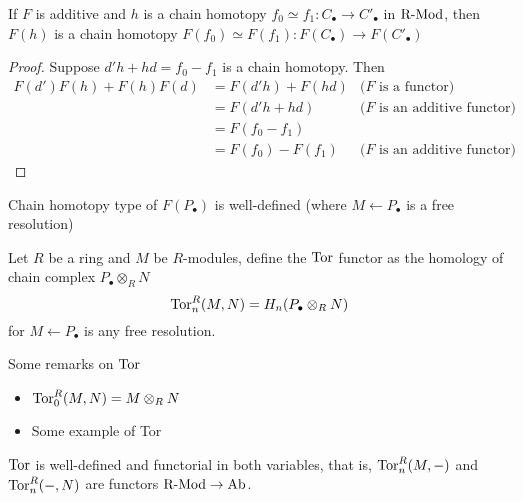 \documentclass{report}
\begin{document}
\begin{lemma}
    If $F$ is additive and $h$ is a chain homotopy $f_0 \simeq f_1: C_\bullet \to C'_\bullet$ in $\operatorname{R-Mod}$, then $F(h)$ is a chain homotopy $F(f_0) \simeq F(f_1): F (C_\bullet) \to F(C'_\bullet)$
\end{lemma}

\begin{proof}
    Suppose $d'h + hd = f_0 - f_1$ is a chain homotopy. Then
    \begin{align*}
        F(d') F(h) + F(h) F(d)
        &= F(d' h) + F(h d) &\text{($F$ is a functor)} \\
        &= F(d'h + hd) &\text{($F$ is an additive functor)} \\
        &= F(f_0 - f_1) \\
        &= F(f_0) - F(f_1) &\text{($F$ is an additive functor)}
    \end{align*}
\end{proof}

\begin{corollary}
    Chain homotopy type of $F(P_\bullet)$ is well-defined (where $M \leftarrow P_\bullet$ is a free resolution)
\end{corollary}

\begin{remark}
\end{remark}

\begin{definition}
    Let $R$ be a ring and $M$ be $R$-modules, define the $\operatorname{Tor}$ functor as the homology of chain complex $P_\bullet \otimes_R N$
    $$
        \operatorname{Tor}^R_n(M, N) = H_n(P_\bullet \otimes_R N)
    $$
    for $M \leftarrow P_\bullet$ is any free resolution.
\end{definition}

\begin{remark}
    Some remarks on $\operatorname{Tor}$
    \begin{itemize}
        \item $\operatorname{Tor}^R_0(M, N) = M \otimes_R N$
        \item Some example of Tor 
    \end{itemize}
    
\end{remark}

\begin{proposition}
    $\operatorname{Tor}$ is well-defined and functorial in both variables, that is, $\operatorname{Tor}^R_n(M, -)$ and $\operatorname{Tor}^R_n(-, N)$ are functors $\operatorname{R-Mod} \to \operatorname{Ab}$.
\end{proposition}
\end{document}
